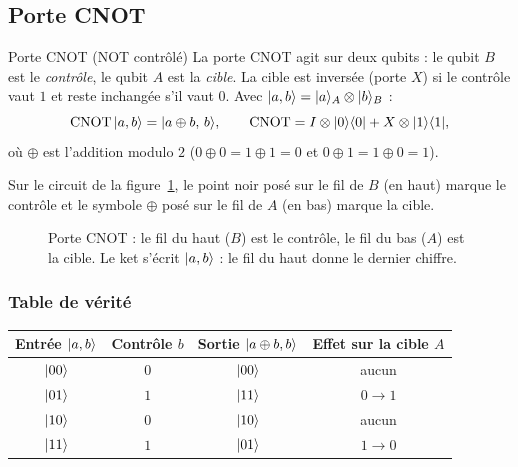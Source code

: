 \subsection{Porte CNOT}\label{sec:cnot}

\begin{definition}{Porte CNOT (NOT contrôlé)}
La porte CNOT agit sur deux qubits : le qubit $B$ est le \emph{contrôle}, le qubit $A$ est la
\emph{cible}. La cible est inversée (porte $X$) si le contrôle vaut $1$ et reste inchangée
s'il vaut $0$. Avec $|a,b\rangle=|a\rangle_A\otimes|b\rangle_B$ :
\[
  \mathrm{CNOT}\,|a,b\rangle=|a\oplus b,\,b\rangle,
  \qquad
  \mathrm{CNOT}=I\otimes|0\rangle\langle 0|+X\otimes|1\rangle\langle 1|,
\]
où $\oplus$ est l'addition modulo $2$ ($0\oplus0=1\oplus1=0$ et $0\oplus1=1\oplus0=1$).
\end{definition}

Sur le circuit de la figure~\ref{fig:cnot}, le point noir posé sur le fil de $B$ (en haut) marque
le contrôle et le symbole $\oplus$ posé sur le fil de $A$ (en bas) marque la cible.

\begin{figure}[!ht]
\centering
{}
\caption{Porte CNOT : le fil du haut ($B$) est le contrôle, le fil du bas ($A$) est la cible. Le
ket s'écrit $|a,b\rangle$ : le fil du haut donne le dernier chiffre.}
\label{fig:cnot}
\end{figure}

\subsubsection{Table de vérité}

\begin{center}
\renewcommand{\arraystretch}{1.3}
\begin{tabular}{@{}cccc@{}}
\toprule
Entrée $|a,b\rangle$ & Contrôle $b$ & Sortie $|a\oplus b,b\rangle$ & Effet sur la cible $A$ \\
\midrule
$|00\rangle$ & $0$ & $|00\rangle$ & aucun \\
$|01\rangle$ & $1$ & $|11\rangle$ & $0\to1$ \\
$|10\rangle$ & $0$ & $|10\rangle$ & aucun \\
$|11\rangle$ & $1$ & $|01\rangle$ & $1\to0$ \\
\bottomrule
\end{tabular}
\end{center}

